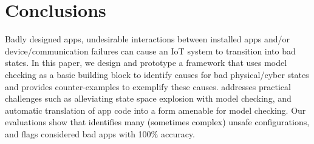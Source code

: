 \chapter{Conclusions}
Badly designed apps, undesirable interactions between installed apps and/or {\color{black}device/communication failures} can cause an IoT system to transition into bad states. In this paper, we design and prototype a framework \sys that 
uses model checking as a basic building block to identify causes for bad physical/cyber states 
and provides counter-examples to exemplify these causes.
\sys addresses practical challenges such as alleviating state space
explosion with model checking, and automatic translation of app code into a form
amenable for model checking. %
Our evaluations show
that \sys \textcolor{black}{identifies many (sometimes complex) unsafe configurations}, 
and 
{\color{black}flags considered bad apps with 100\% accuracy.}
